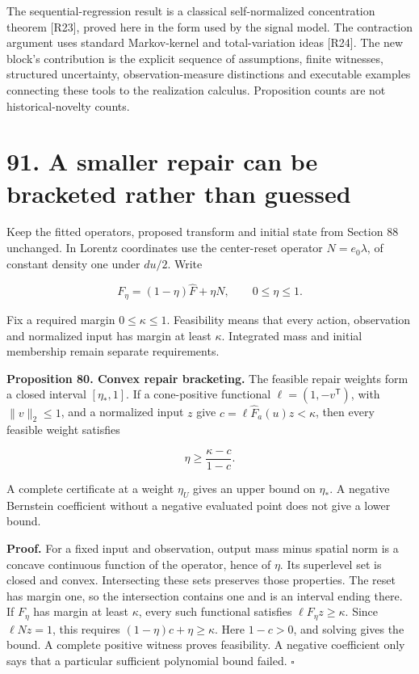 \documentclass[11pt,letterpaper]{article}
\begin{document}
The sequential-regression result is a classical self-normalized
concentration theorem {[}R23{]}, proved here in the form used by the
signal model. The contraction argument uses standard Markov-kernel and
total-variation ideas {[}R24{]}. The new block's contribution is the
explicit sequence of assumptions, finite witnesses, structured
uncertainty, observation-measure distinctions and executable examples
connecting these tools to the realization calculus. Proposition counts
are not historical-novelty counts.

\newpage

\section{91. A smaller repair can be bracketed rather than
guessed}\label{a-smaller-repair-can-be-bracketed-rather-than-guessed}

Keep the fitted operators, proposed transform and initial state from
Section 88 unchanged. In Lorentz coordinates use the center-reset
operator \(N=e_0\lambda\), of constant density one under \(du/2\). Write

\[
F_\eta=(1-\eta)\widehat F+\eta N,
\qquad 0\leq\eta\leq1.
\]

Fix a required margin \(0\leq\kappa\leq1\). Feasibility means that every
action, observation and normalized input has margin at least \(\kappa\).
Integrated mass and initial membership remain separate requirements.

\textbf{Proposition 80. Convex repair bracketing.} The feasible repair
weights form a closed interval \([\eta_*,1]\). If a cone-positive
functional \(\ell=(1,-v^{\mathsf T})\), with \(\|v\|_2\leq1\), and a
normalized input \(z\) give \(c=\ell\widehat F_a(u)z<\kappa\), then
every feasible weight satisfies

\[
\boxed{\eta\geq\frac{\kappa-c}{1-c}.}
\]

A complete certificate at a weight \(\eta_U\) gives an upper bound on
\(\eta_*\). A negative Bernstein coefficient without a negative
evaluated point does not give a lower bound.

\textbf{Proof.} For a fixed input and observation, output mass minus
spatial norm is a concave continuous function of the operator, hence of
\(\eta\). Its superlevel set is closed and convex. Intersecting these
sets preserves those properties. The reset has margin one, so the
intersection contains one and is an interval ending there. If \(F_\eta\)
has margin at least \(\kappa\), every such functional satisfies
\(\ell F_\eta z\geq\kappa\). Since \(\ell Nz=1\), this requires
\((1-\eta)c+\eta\geq\kappa\). Here \(1-c>0\), and solving gives the
bound. A complete positive witness proves feasibility. A negative
coefficient only says that a particular sufficient polynomial bound
failed. \(\square\)
\end{document}
